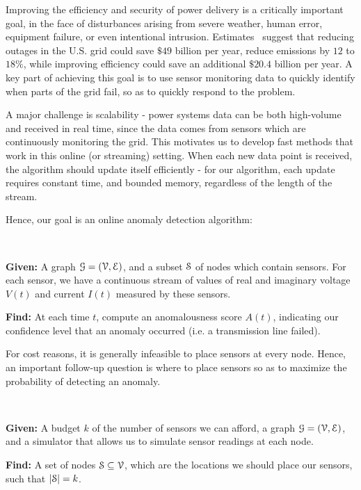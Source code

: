 Improving the efficiency and security of power delivery is a critically important goal, in the face of disturbances arising from severe weather, human error, equipment failure, or even intentional intrusion. Estimates~\cite{amin2011us} suggest that reducing outages in the U.S. grid could save $\$ 49$ billion per year, reduce emissions by $12$ to $18\%$, while improving efficiency could save an additional $\$ 20.4$ billion per year. A key part of achieving this goal is to use sensor monitoring data to quickly identify when parts of the grid fail, so as to quickly respond to the problem. 

A major challenge is scalability - power systems data can be both high-volume and received in real time, since the data comes from sensors which are continuously monitoring the grid. This motivates us to develop fast methods that work in this online (or streaming) setting. When each new data point is received, the algorithm should update itself efficiently - for our algorithm, each update requires constant time, and bounded memory, regardless of the length of the stream.

Hence, our goal is an online anomaly detection algorithm:

\begin{iproblem}\ \vspace{.0cm}
\bit
    \item \textbf{Given:} A graph $\G = (\V, \E)$, and a subset $\S$ of nodes which contain sensors. For each sensor, we have a continuous stream of values of real and imaginary voltage $V(t)$ and current $I(t)$ measured by these sensors.
    \item \textbf{Find:} At each time $t$, compute an anomalousness score $A(t)$, indicating our confidence level that an anomaly occurred (i.e. a transmission line failed). 
\eit
\end{iproblem}

For cost reasons, it is generally infeasible to place sensors at every node. Hence, an important follow-up question is where to place sensors so as to maximize the probability of detecting an anomaly. 

\begin{iproblem}\ \vspace{.0cm}
\bit
    \item \textbf{Given:} A budget $k$ of the number of sensors we can afford, a graph $\G = (\V, \E)$, and a simulator that allows us to simulate sensor readings at each node.
    \item \textbf{Find:} A set of nodes $\S \subseteq \V$, which are the locations we should place our sensors, such that $|\S|=k$. 
\eit
\end{iproblem}

